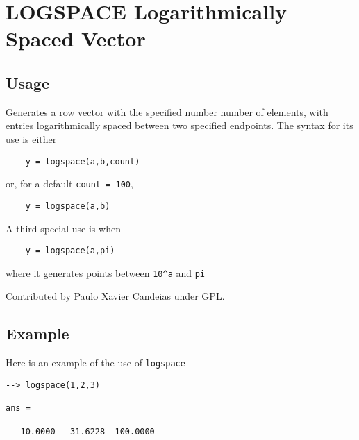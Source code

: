\section{LOGSPACE Logarithmically Spaced Vector}

\subsection{Usage}

Generates a row vector with the specified number number of elements,
with entries logarithmically spaced between two specified endpoints.
The syntax for its use is either
\begin{verbatim}
    y = logspace(a,b,count)
\end{verbatim}
 or, for a default \verb|count = 100|,
\begin{verbatim}
    y = logspace(a,b)
\end{verbatim}
 A third special use is when
\begin{verbatim}
    y = logspace(a,pi)
\end{verbatim}
where it generates points between \verb|10^a| and \verb|pi|

Contributed by Paulo Xavier Candeias under GPL.
\subsection{Example}

Here is an example of the use of \verb|logspace|
\begin{verbatim}
--> logspace(1,2,3)

ans = 

   10.0000   31.6228  100.0000 
\end{verbatim}
